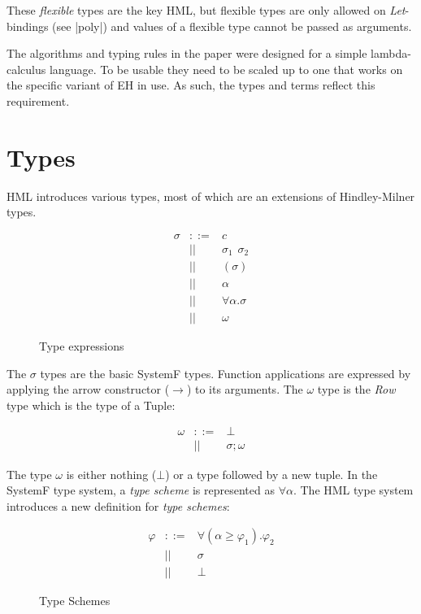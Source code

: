 These \textit{flexible} types are the key HML, but flexible types are only allowed on \textit{Let}-bindings (see |poly|) and values of a flexible type cannot be passed as arguments.

The algorithms and typing rules in the paper were designed for a simple lambda-calculus language. To be usable they need to be scaled up to one that works on the specific variant of EH in use. As such, the types and terms reflect this requirement.
\section{Types}
\label{sec:Types}
HML introduces various types, most of which are an extensions of Hindley-Milner types. 

\begin{figure}[H]
\begin{eqnarray*}
\sigma & ::= & c \\ 
       & || & \sigma_1 \hspace{5pt} \sigma_2 \\
       & || & (\sigma) \\ 
       & || & \alpha \\ 
       & || & \forall \alpha . \sigma \\
       & || & \omega
\end{eqnarray*}
\caption{Type expressions}
\label{types}
\end{figure}

The $\sigma$ types are the basic SystemF types. Function applications are expressed by applying the arrow constructor ($\rightarrow$) to its arguments. The $\omega$ type is the \emph{Row} type which is the type of a Tuple:

\begin{eqnarray*}
\omega & ::= & \bot \\
       & || & \sigma ; \omega
\end{eqnarray*}

The type $\omega$ is either nothing ($\bot$) or a type followed by a new tuple.
In the SystemF type system, a \emph{type scheme} is represented as $\forall \alpha$. The HML type system introduces a new definition for \emph{type schemes}:

\begin{figure}[H]
\begin{eqnarray*}
\varphi & ::= & \forall (\alpha \geq \varphi_1). \varphi_2 \\
        & || & \sigma \\
        & || & \bot
\end{eqnarray*}
\caption{Type Schemes}
\label{type-schemes}
\end{figure}

